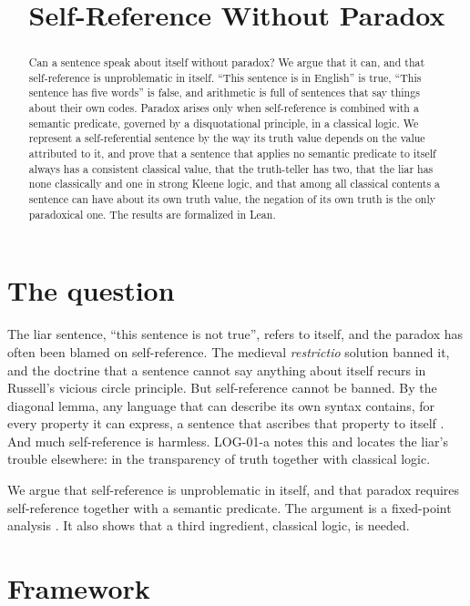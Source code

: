 \documentclass{situationist-preprint}
\title{Self-Reference Without Paradox}
\begin{document}
\maketitle

\begin{abstract}
Can a sentence speak about itself without paradox? We argue that it can, and that self-reference is unproblematic in itself. \enquote{This sentence is in English} is true, \enquote{This sentence has five words} is false, and arithmetic is full of sentences that say things about their own codes. Paradox arises only when self-reference is combined with a semantic predicate, governed by a disquotational principle, in a classical logic. We represent a self-referential sentence by the way its truth value depends on the value attributed to it, and prove that a sentence that applies no semantic predicate to itself always has a consistent classical value, that the truth-teller has two, that the liar has none classically and one in strong Kleene logic, and that among all classical contents a sentence can have about its own truth value, the negation of its own truth is the only paradoxical one. The results are formalized in Lean.
\end{abstract}

\section{The question}

The liar sentence, \enquote{this sentence is not true}, refers to itself, and the paradox has often been blamed on self-reference. The medieval \emph{restrictio} solution banned it, and the doctrine that a sentence cannot say anything about itself recurs in Russell's vicious circle principle. But self-reference cannot be banned. By the diagonal lemma, any language that can describe its own syntax contains, for every property it can express, a sentence that ascribes that property to itself \citep{Godel1931}. And much self-reference is harmless. LOG-01-a notes this and locates the liar's trouble elsewhere: in the transparency of truth together with classical logic.

We argue that self-reference is unproblematic in itself, and that paradox requires self-reference together with a semantic predicate. The argument is a fixed-point analysis \citep{Kripke1975}. It also shows that a third ingredient, classical logic, is needed.

\section{Framework}
\end{document}
